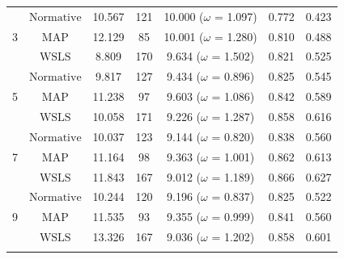 \documentclass[doc,natbib,floatsintext]{apa7}
\begin{document}
\begin{appendices}
\begin{table}[!ht]
\begin{center}
{\begin{tabular}{c c c c c c c}
\midrule
& $\text{Normative}$ & 10.567 & 121 & 10.000 ($\omega$ = 1.097) & 0.772 & 0.423\\

3 & $\text{MAP}$ & 12.129 & 85 & 10.001 ($\omega$ = 1.280) & 0.810 & 0.488 \\

& $\text{WSLS}$ & 8.809 & 170 & 9.634 ($\omega$ = 1.502) & 0.821 & 0.525\\

\midrule
& $\text{Normative}$ & 9.817 & 127 & 9.434 ($\omega$ = 0.896) & 0.825 & 0.545\\

5 & $\text{MAP}$ & 11.238 & 97 & 9.603 ($\omega$ = 1.086) & 0.842 & 0.589 \\

& $\text{WSLS}$ & 10.058 & 171 & 9.226 ($\omega$ = 1.287) & 0.858 & 0.616\\

\midrule
& $\text{Normative}$ & 10.037 &  123 & 9.144 ($\omega$ = 0.820) & 0.838 & 0.560\\

7 & $\text{MAP}$ & 11.164 & 98 & 9.363 ($\omega$ = 1.001) & 0.862 & 0.613 \\

& $\text{WSLS}$ & 11.843 & 167 & 9.012 ($\omega$ = 1.189) & 0.866 & 0.627\\

\midrule
& $\text{Normative}$ & 10.244 & 120 & 9.196 ($\omega$ = 0.837) & 0.825 & 0.522\\

9 & $\text{MAP}$ & 11.535 & 93 &  9.355 ($\omega$ = 0.999) & 0.841 & 0.560 \\

& $\text{WSLS}$ & 13.326 & 167 &  9.036 ($\omega$ = 1.202) & 0.858 & 0.601 \\

\bottomrule


\label{table:table_a8_2_exp_1_norm_model_res}
\end{tabular}}
\end{center} 
\end{table}


\begin{table}[!ht]
\begin{center} 
\caption{Experiment 1. TR- and TS results for different values of $\lambda$ and $b$ (248 Trials).} 
\vskip 0.10in
\end{center}
\end{table}
\end{appendices}
\end{document}
